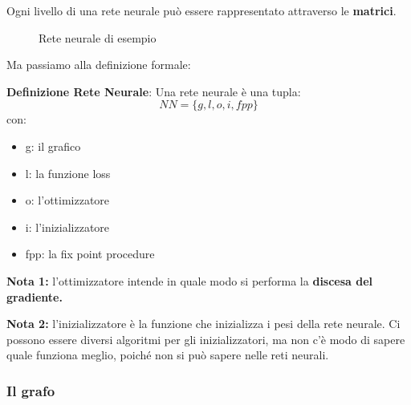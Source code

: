 Ogni livello di una rete neurale può essere rappresentato attraverso le
\textbf{matrici}.

\begin{figure}[h!]
    \centering
    \caption{Rete neurale di esempio}
    \label{fig:my_label}
\end{figure}

Ma passiamo alla definizione formale:

\textbf{Definizione Rete Neurale}: Una rete neurale è una tupla:
\begin{equation}
    NN = \{g,l,o,i,fpp\}
\end{equation}
con:
\begin{itemize}
    \item g: il grafico
    \item l: la funzione loss
    \item o: l'ottimizzatore
    \item i: l'inizializzatore
    \item fpp: la fix point procedure
\end{itemize}

\textbf{Nota 1:} l'ottimizzatore intende in quale modo si performa la \textbf{discesa del gradiente.}

\textbf{Nota 2:} l'inizializzatore è la funzione che inizializza i pesi della rete neurale. Ci possono essere diversi algoritmi per gli
inizializzatori, ma non c'è modo di sapere quale funziona meglio, poiché non si può sapere nelle reti neurali.

\subsubsection{Il grafo}

